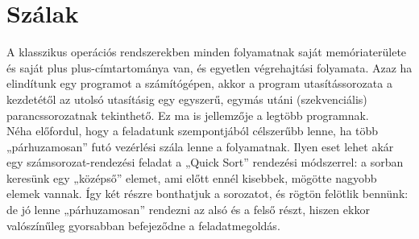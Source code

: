 \documentclass[tikz,12pt,margin=0px]{article}
\newcommand\lword[1]{\leavevmode\nobreak\hskip0pt plus\linewidth\penalty50\hskip0pt plus-\linewidth\nobreak #1}
\begin{document}

    \section*{Szálak}

    \noindent A klasszikus operációs rendszerekben minden folyamatnak saját memóriaterülete és saját \lword{címtartománya} van, és egyetlen végrehajtási folyamata. Azaz ha elindítunk egy programot a számítógépen, akkor a program utasítássorozata a kezdetétől az utolsó utasításig egy egyszerű, egymás utáni (szekvenciális) parancssorozatnak tekinthető. Ez ma is jellemzője a legtöbb programnak.\\

    \noindent Néha előfordul, hogy a feladatunk szempontjából célszerűbb lenne, ha több „párhuzamosan” futó vezérlési szála lenne a folyamatnak. Ilyen eset lehet akár egy számsorozat-rendezési feladat a „Quick Sort” rendezési módszerrel: a sorban keresünk egy „középső” elemet, ami előtt ennél kisebbek, mögötte nagyobb elemek vannak. Így két részre bonthatjuk a sorozatot, és rögtön felötlik bennünk: de jó lenne „párhuzamosan” rendezni az alsó és a felső részt, hiszen ekkor valószínűleg gyorsabban befejeződne a feladatmegoldás.\\
\end{document}
